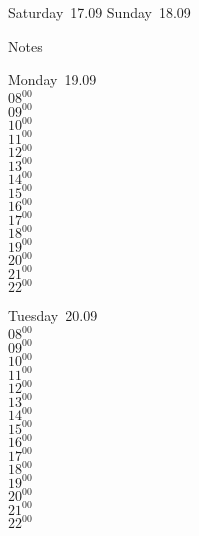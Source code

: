 \documentclass[11pt,a4paper]{book}\usepackage[]{graphicx}\usepackage[]{color}
\begin{document}
\begin{weekendbox}
  Saturday~17.09
  \tcblower
  Sunday~18.09
\end{weekendbox} %
\begin{notebox}
  Notes
\end{notebox}
\clearpage
\begin{headerbox}
\end{headerbox}
\begin{weekdaybox}
  Monday~19.09\\
  { 
  \vfill
  $08^{00}$\\
$09^{00}$\\
$10^{00}$\\
$11^{00}$\\
$12^{00}$\\
$13^{00}$\\
$14^{00}$\\
$15^{00}$\\
$16^{00}$\\
$17^{00}$\\
$18^{00}$\\
$19^{00}$\\
$20^{00}$\\
$21^{00}$\\
$22^{00}$\\
  }
\end{weekdaybox}
\begin{weekdaybox}
  Tuesday~20.09\\
  { 
  \vfill
  $08^{00}$\\
$09^{00}$\\
$10^{00}$\\
$11^{00}$\\
$12^{00}$\\
$13^{00}$\\
$14^{00}$\\
$15^{00}$\\
$16^{00}$\\
$17^{00}$\\
$18^{00}$\\
$19^{00}$\\
$20^{00}$\\
$21^{00}$\\
$22^{00}$\\
  }
\end{weekdaybox}
\end{document}
